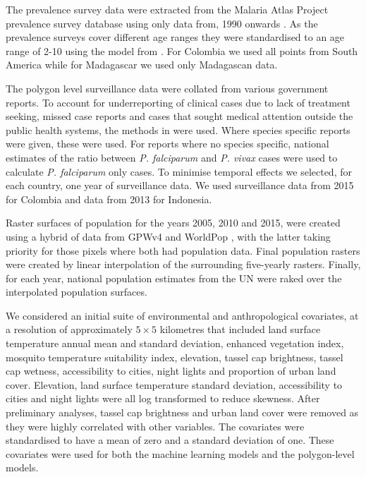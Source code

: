 \documentclass[11pt]{article}
\begin{document}
The prevalence survey data were extracted from the Malaria Atlas Project prevalence survey database using only data from, 1990 onwards \citep{bhatt2015effect}. 
As the prevalence surveys cover different age ranges they were standardised to an age range of 2-10 using the model from \citep{smith2007standardizing}. 
For Colombia we used all points from South America while for Madagascar we used only Madagascan data.

The polygon level surveillance data were collated from various government reports. To account for underreporting of clinical cases due to lack of treatment seeking, missed case reports and cases that sought medical attention outside the public health systems, the methods in \citep{cibulskis2011worldwide} were used. Where species specific reports were given, these were used. For reports where no species specific, national estimates of the ratio between \emph{P. falciparum} and \emph{P. vivax} cases were used to calculate \emph{P. falciparum} only cases. To minimise temporal effects we selected, for each country, one year of surveillance data. 
We used surveillance data from 2015 for Colombia and data from 2013 for Indonesia.

Raster surfaces of population for the years 2005, 2010 and 2015, were created using a hybrid of data from GPWv4 \citep{gpw4} and WorldPop \citep{tatem2017worldpop}, with the latter taking priority for those pixels where both had population data. 
Final population rasters were created by linear interpolation of the surrounding five-yearly rasters. 
Finally, for each year, national population estimates from the UN were raked over the interpolated population surfaces. 

We considered an initial suite of environmental and anthropological covariates, at a resolution of approximately $5 \times 5$ kilometres that included land surface temperature annual mean and standard deviation, enhanced vegetation index, mosquito temperature suitability index, elevation, tassel cap brightness, tassel cap wetness, accessibility to cities, night lights and proportion of urban land cover. 
Elevation, land surface temperature standard deviation, accessibility to cities and night lights were all log transformed to reduce skewness. 
After preliminary analyses, tassel cap brightness and urban land cover were removed as they were highly correlated with other variables. 
The covariates were standardised to have a mean of zero and a standard deviation of one. 
These covariates were used for both the machine learning models and the polygon-level models.
\end{document}
